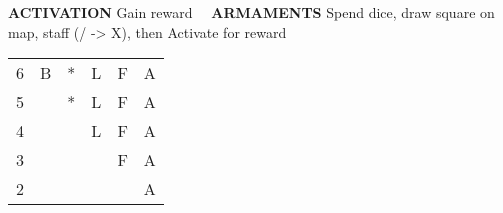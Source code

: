 \begin{flushleft}
\textbf{ACTIVATION} \textcolor{supplemental}{Gain reward} \ \ \textbf{ARMAMENTS}
\textcolor{supplemental}{Spend dice, draw square on map, staff (/ -> X), then 
Activate for reward}
\end{flushleft}
\begin{tabular}{|l|lllll}
\cline{1-1}
6 & \cellcolor{supplemental}B & *                         & L                         & F                         & A                         \\ \cline{1-1}
5 &                           & \cellcolor{supplemental}* & L                         & F                         & A                         \\ \cline{1-1}
4 &                           &                           & \cellcolor{supplemental}L & F                         & A                         \\ \cline{1-1}
3 &                           &                           &                           & \cellcolor{supplemental}F & A                         \\ \cline{1-1}
2 &                           &                           &                           &                           & \cellcolor{supplemental}A \\ \cline{1-1}
\end{tabular}
